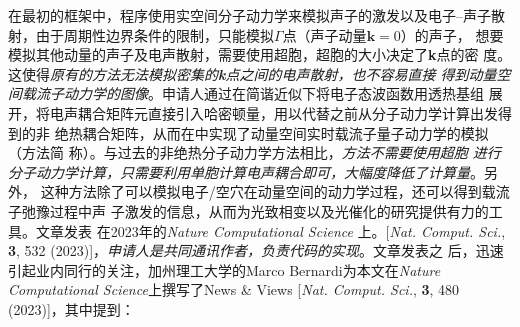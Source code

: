 在最初的\hnamd{}框架中，程序使用实空间分子动力学来模拟声子的激发以及电子--声子散
射，由于周期性边界条件的限制，只能模拟$\Gamma$点（声子动量$\mathbf{k}=0$）的声子，
想要模拟其他动量的声子及电声散射，需要使用超胞，超胞的大小决定了\textbf{k}点的密
度。这使得\emph{原有的方法无法模拟密集的\textbf{k}点之间的电声散射，也不容易直接
  得到动量空间载流子动力学的图像}。申请人通过在简谐近似下将电子态波函数用透热基组
展开，将电声耦合矩阵元直接引入哈密顿量，用以代替之前从分子动力学计算出发得到的非
绝热耦合矩阵，从而在\hnamd{}中实现了动量空间实时载流子量子动力学的模拟（方法简
称\namdk{}）。与过去的非绝热分子动力学方法相比，\emph{\namdk{}方法不需要使用超胞
  进行分子动力学计算，只需要利用单胞计算电声耦合即可，大幅度降低了计算量}。另外，
这种方法除了可以模拟电子/空穴在动量空间的动力学过程，还可以得到载流子弛豫过程中声
子激发的信息，从而为光致相变以及光催化的研究提供有力的工具。文章发表
在2023年的\textit{Nature Computational Science} 上。[\textit{Nat. Comput. Sci.},
\textbf{3}, 532 (2023)]，\emph{申请人是共同通讯作者，负责代码的实现}。文章发表之
后，迅速引起业内同行的关注，加州理工大学的Marco Bernardi为本文在\textit{Nature
  Computational Science}上撰写了News \& Views [\textit{Nat. Comput. Sci.},
\textbf{3}, 480 (2023)]，其中提到：

\begin{center}
\end{center}

